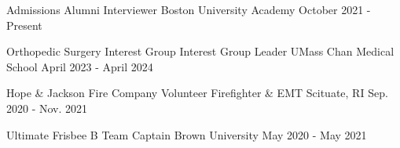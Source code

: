 
\begin{cventries}

\vspace{-1mm}
\cventry
  {Admissions} %
  {Alumni Interviewer} %
  {Boston University Academy} %
  {October 2021 - Present} %
  {}

\cventry
  {Orthopedic Surgery Interest Group} %
  {Interest Group Leader} %
  {UMass Chan Medical School} %
  {April 2023 - April 2024} %
  {}

\cventry
  {Hope \& Jackson Fire Company} %
  {Volunteer Firefighter \& EMT} %
  {Scituate, RI} %
  {Sep. 2020 - Nov. 2021} %
  {}

\cventry
{Ultimate Frisbee B Team} %
{Captain} %
{Brown University} %
{May 2020 - May 2021} %
{}

\end{cventries}
